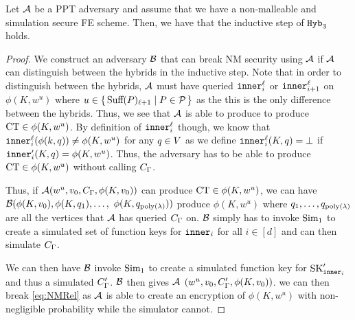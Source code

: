 \begin{lemma}
		\label{lem:NMIndep}
		Let $\mathcal{A}$ be a PPT adversary and assume that we have a non-malleable and simulation secure
		FE scheme. Then, we have that the inductive step of $\texttt{Hyb}_3$ holds.
		\begin{proof}
			We construct an adversary $\mathcal{B}$ that can break NM security using $\mathcal{A}$ if $\mathcal{A}$ can distinguish between the hybrids
			in the inductive step.
			Note that in order to distinguish between the hybrids, $\mathcal{A}$ must have queried $\texttt{inner}^\ell_i$ or $\texttt{inner}^\ell_{i + 1}$ on $\phi(K, w^u)$ where $u \in \set{\text{Suff}(P)_{\ell + 1} \mid P \in \mathcal{P}}$
			as the this is the only difference between the hybrids.
			Thus, we see that $\mathcal{A}$ is able to produce to produce $\text{CT} \in \phi(K, w^u)$.
			By definition of $\texttt{inner}_i^\ell$ though, we know that $\texttt{inner}_i^\ell(\phi(k, q)) \neq \phi(K, w^u)$
			for any $q \in V$ as we define $\texttt{inner}_i^\ell(K, q) = \bot$ if $\texttt{inner}_i'(K, q) = \phi(K, w^u)$.
			Thus, the adversary has to be able to produce $\text{CT} \in \phi(K, w^u)$ without calling $C_\Gamma$.

			Thus, if $\mathcal{A}(w^u, v_0, C_\Gamma, \phi(K, v_0))$ can produce $\text{CT} \in \phi(K, w^u)$,
			we can have $\mathcal{B}(\phi(K, v_0), \phi(K, q_1), \dots,$ $ \phi(K,q_{\operatorname{poly}(\lambda)}))$ 
			produce $\phi(K, w^u)$ where $q_1, \dots, q_{\operatorname{poly}(\lambda)}$ are all the vertices that $\mathcal{A}$ has queried $C_\Gamma$ on.
			$\mathcal{B}$ simply has to invoke $\text{Sim}_1$ to create a simulated set of function keys for $\texttt{inner}_i$ for all $i \in [d]$
			and can then simulate $C_\Gamma$.

			We can then have $\mathcal{B}$ invoke $\text{Sim}_1$ to create a simulated function key for $\text{SK}_{\texttt{inner}_i}'$
			and thus a simulated $C_\Gamma'$.
			$\mathcal{B}$ then gives $\mathcal{A}$ $(w^u, v_0, C_\Gamma', \phi(K, v_0))$.
			we can then break \cref{eq:NMRel} as $\mathcal{A}$ is able to create an encryption of $\phi(K, w^u)$ with non-negligible probability while the simulator cannot.
		\end{proof}
\end{lemma}

